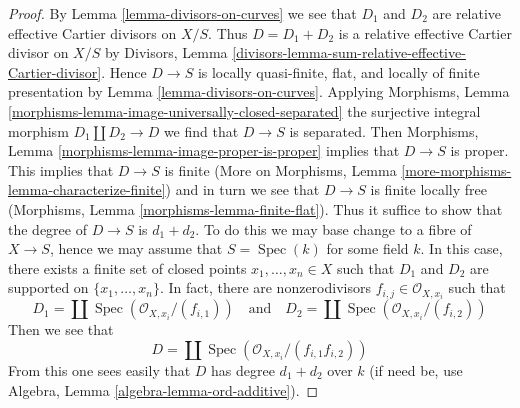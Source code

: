\documentclass[10pt,a4paper]{amsart}
\theoremstyle{plain}
\theoremstyle{definition}
\theoremstyle{remark}
\numberwithin{equation}{subsection}
\def\Spec{\mathop{\mathrm{Spec}}}
\begin{document}
\begin{proof}
By Lemma \ref{lemma-divisors-on-curves} we see that $D_1$
and $D_2$ are relative effective Cartier divisors on $X/S$.
Thus $D = D_1 + D_2$ is a relative effective Cartier divisor
on $X/S$ by
Divisors, Lemma \ref{divisors-lemma-sum-relative-effective-Cartier-divisor}.
Hence $D \to S$ is locally quasi-finite, flat, and
locally of finite presentation by
Lemma \ref{lemma-divisors-on-curves}.
Applying
Morphisms, Lemma \ref{morphisms-lemma-image-universally-closed-separated}
the surjective integral morphism $D_1 \amalg D_2 \to D$
we find that $D \to S$ is separated. Then
Morphisms, Lemma \ref{morphisms-lemma-image-proper-is-proper}
implies that $D \to S$ is proper.
This implies that $D \to S$ is finite
(More on Morphisms, Lemma \ref{more-morphisms-lemma-characterize-finite})
and in turn we see that $D \to S$ is finite locally free
(Morphisms, Lemma \ref{morphisms-lemma-finite-flat}).
Thus it suffice to show that the degree of $D \to S$ is $d_1 + d_2$.
To do this we may base change to a fibre of $X \to S$, hence we may
assume that $S = \Spec(k)$ for some field $k$.
In this case, there exists a finite set of closed points
$x_1, \ldots, x_n \in X$ such that $D_1$ and $D_2$
are supported on $\{x_1, \ldots, x_n\}$.
In fact, there are nonzerodivisors $f_{i, j} \in \mathcal{O}_{X, x_i}$
such that
$$
D_1 = \coprod \Spec(\mathcal{O}_{X, x_i}/(f_{i, 1}))
\quad\text{and}\quad
D_2 = \coprod \Spec(\mathcal{O}_{X, x_i}/(f_{i, 2}))
$$
Then we see that
$$
D = \coprod \Spec(\mathcal{O}_{X, x_i}/(f_{i, 1}f_{i, 2}))
$$
From this one sees easily that $D$ has degree $d_1 + d_2$
over $k$ (if need be, use Algebra, Lemma \ref{algebra-lemma-ord-additive}).
\end{proof}
\end{document}
